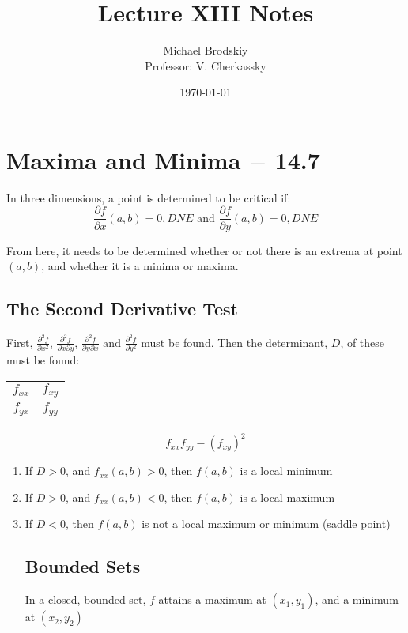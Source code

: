 \documentclass[12pt]{article}
\title{Lecture XIII Notes}
\date{\today}
\author{Michael Brodskiy\\ \small Professor: V. Cherkassky}
\begin{document}
\maketitle

\section{Maxima and Minima $-$ 14.7}


In three dimensions, a point is determined to be critical if:
$$\frac{\partial f}{\partial x}(a,b)=0,DNE\text{ and } \frac{\partial f}{\partial y}(a,b)=0,DNE$$

From here, it needs to be determined whether or not there is an extrema at point $(a,b)$, and whether it is a minima or maxima.

\subsection{The Second Derivative Test}

First, $\frac{\partial^2f}{\partial x^2}\text{, } \frac{\partial^2f}{\partial x \partial y}\text{, } \frac{\partial^2f}{\partial y \partial x}\text{ and } \frac{\partial^2f}{\partial y^2}$ must be found. Then the determinant, $D$, of these must be found:
\begin{center}
  \begin{tabular}{|c c|}
    $f_{xx}$ & $f_{xy}$ \\
    $f_{yx}$ & $f_{yy}$ \\

  \end{tabular}
\end{center}

$$f_{xx}f_{yy}-(f_{xy})^2$$

\begin{enumerate}

  \item If $D > 0$, and $f_{xx}(a,b)>0$, then $f(a,b)$ is a local minimum

  \item If $D > 0$, and $f_{xx}(a,b)<0$, then $f(a,b)$ is a local maximum

  \item If $D < 0$, then $f(a,b)$ is not a local maximum or minimum (saddle point)

\subsection{Bounded Sets}

In a closed, bounded set, $f$ attains a maximum at $(x_1,y_1)$, and a minimum at $(x_2,y_2)$


\end{enumerate}
\end{document}
